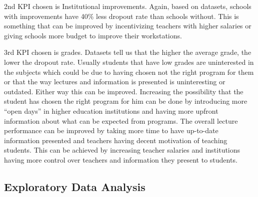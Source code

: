 \documentclass[
  letterpaper,
  DIV=11,
  numbers=noendperiod]{scrartcl}
\begin{document}
2nd KPI chosen is Institutional improvements. Again, based on datasets,
schools with improvements have 40\% less dropout rate than schools
without. This is something that can be improved by incentivizing
teachers with higher salaries or giving schools more budget to improve
their workstations.

3rd KPI chosen is grades. Datasets tell us that the higher the average
grade, the lower the dropout rate. Usually students that have low grades
are uninterested in the subjects which could be due to having chosen not
the right program for them or that the way lectures and information is
presented is uninteresting or outdated. Either way this can be improved.
Increasing the possibility that the student has chosen the right program
for him can be done by introducing more \enquote{open days} in higher
education institutions and having more upfront information about what
can be expected from programs. The overall lecture performance can be
improved by taking more time to have up-to-date information presented
and teachers having decent motivation of teaching students. This can be
achieved by increasing teacher salaries and institutions having more
control over teachers and information they present to students.

\hypertarget{exploratory-data-analysis}{%
\subsection{Exploratory Data Analysis}\label{exploratory-data-analysis}}
\end{document}
